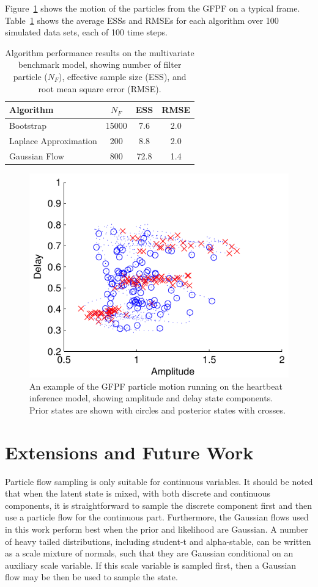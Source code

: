 \documentclass{article}
\begin{document}
Figure~\ref{fig:sineha_example_frame} shows the motion of the particles from the GFPF on a typical frame. Table~\ref{tab:sineha_results} shows the average ESSs and RMSEs for each algorithm over 100 simulated data sets, each of 100 time steps.
%
\begin{table}
\centering
\begin{tabular}{l||c|c|c}
Algorithm                                & $N_F$ & ESS  & RMSE \\
\hline
Bootstrap                                & 15000 &  7.6 &  2.0 \\
Laplace Approximation                    &   200 &  8.8 &  2.0 \\
Gaussian Flow                            &   800 & 72.8 &  1.4 \\
\end{tabular}
\caption{Algorithm performance results on the multivariate benchmark model, showing number of filter particle ($N_F$), effective sample size (ESS), and root mean square error (RMSE).}
\label{tab:sineha_results}
\end{table}
%
\begin{figure}
\centering
\includegraphics[width=0.7\columnwidth]{sineha_example_frame.pdf}
\caption{An example of the GFPF particle motion running on the heartbeat inference model, showing amplitude and delay state components. Prior states are shown with circles and posterior states with crosses.}
\label{fig:sineha_example_frame}
\end{figure}



\section{Extensions and Future Work}

Particle flow sampling is only suitable for continuous variables. It should be noted that when the latent state is mixed, with both discrete and continuous components, it is straightforward to sample the discrete component first and then use a particle flow for the continuous part. Furthermore, the Gaussian flows used in this work perform best when the prior and likelihood are Gaussian. A number of heavy tailed distributions, including student-t and alpha-stable, can be written as a scale mixture of normals, such that they are Gaussian conditional on an auxiliary scale variable. If this scale variable is sampled first, then a Gaussian flow may be then be used to sample the state.
\end{document}
